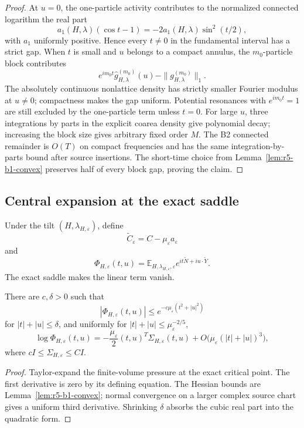 \begin{proof}
At \(u=0\), the one-particle activity contributes to the normalized connected
logarithm the real part
\[
 a_1(H,\lambda)(\cos t-1)
 =-2a_1(H,\lambda)\sin^2(t/2),
\]
with \(a_1\) uniformly positive.  Hence every \(t\ne0\) in the fundamental
interval has a strict gap.  When \(t\) is small and \(u\) belongs to a compact
annulus, the \(m_0\)-particle block contributes
\[
 e^{im_0t}\widehat g_{H,\lambda}^{(m_0)}(u)-\|g_{H,\lambda}^{(m_0)}\|_1.
\]
The absolutely continuous nonlattice density has strictly smaller Fourier
modulus at \(u\ne0\); compactness makes the gap uniform.  Potential resonances
with \(e^{im_0t}=1\) are still excluded by the one-particle term unless
\(t=0\).  For large \(u\), three integrations by parts in the explicit coarea
density give polynomial decay; increasing the block size gives arbitrary
fixed order \(M\).  The B2 connected remainder is \(O(T)\) on compact
frequencies and has the same integration-by-parts bound after source
insertions.  The short-time choice from
Lemma~\ref{lem:r5-b1-convex} preserves half of every block gap, proving the
claim.
\end{proof}

\subsection{Central expansion at the exact saddle}

Under the tilt \((H,\lambda_{H,\varepsilon})\), define
\[
 \widetilde C_\varepsilon=C-\mu_\varepsilon a_\varepsilon
\]
and
\[
 \Phi_{H,\varepsilon}(t,u)=
 \mathbb E_{H,\lambda_{H,\varepsilon},\varepsilon}
 e^{it\widetilde N+i u\cdot\widetilde Y}.
\]
The exact saddle makes the linear term vanish.

\begin{lemma}
\label{lem:r5-b1-central}
There are \(c,\delta>0\) such that
\[
 |\Phi_{H,\varepsilon}(t,u)|
 \le e^{-c\mu_\varepsilon(t^2+|u|^2)}
\]
for \(|t|+|u|\le\delta\), and uniformly for
\(|t|+|u|\le\mu_\varepsilon^{-2/5}\),
\[
 \log\Phi_{H,\varepsilon}(t,u)=
 -\frac{\mu_\varepsilon}{2}
 (t,u)^T\Sigma_{H,\varepsilon}(t,u)
 +O\bigl(\mu_\varepsilon(|t|+|u|)^3\bigr),
\]
where
\(cI\le\Sigma_{H,\varepsilon}\le CI\).
\end{lemma}

\begin{proof}
Taylor-expand the finite-volume pressure at the exact critical point.  The
first derivative is zero by its defining equation.  The Hessian bounds are
Lemma~\ref{lem:r5-b1-convex}; normal convergence on a larger complex source
chart gives a uniform third derivative.  Shrinking \(\delta\) absorbs the
cubic real part into the quadratic form.
\end{proof}


